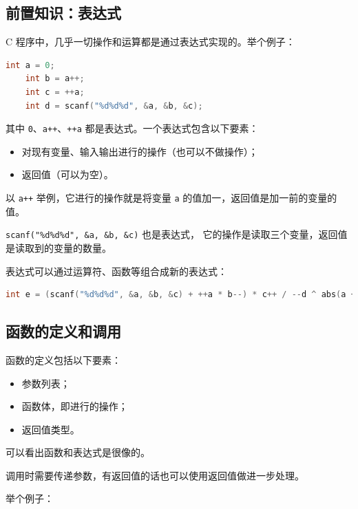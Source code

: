 \documentclass[lang=cn,newtx,10pt,scheme=chinese]{elegantbook}
\begin{document}
\subsection{前置知识：表达式}

C 程序中，几乎一切操作和运算都是通过表达式实现的。举个例子：

\begin{lstlisting}[language=C]
    int a = 0;
    int b = a++;
    int c = ++a;
    int d = scanf("%d%d%d", &a, &b, &c);
\end{lstlisting}

其中 \lstinline{0}、\lstinline{a++}、\lstinline{++a} 都是表达式。一个表达式包含以下要素：

\begin{itemize}
    \item 对现有变量、输入输出进行的操作（也可以不做操作）；
    \item 返回值（可以为空）。
\end{itemize}

以 \lstinline{a++} 举例，它进行的操作就是将变量 \lstinline{a} 的值加一，返回值是加一前的变量的值。

\lstinline{scanf("%d%d%d", &a, &b, &c)} 也是表达式，
它的操作是读取三个变量，返回值是读取到的变量的数量。

表达式可以通过运算符、函数等组合成新的表达式：

\begin{lstlisting}[language=C]
    int e = (scanf("%d%d%d", &a, &b, &c) + ++a * b--) * c++ / --d ^ abs(a + b);
\end{lstlisting}

\subsection{函数的定义和调用}

函数的定义包括以下要素：

\begin{itemize}
    \item 参数列表；
    \item 函数体，即进行的操作；
    \item 返回值类型。
\end{itemize}

可以看出函数和表达式是很像的。

调用时需要传递参数，有返回值的话也可以使用返回值做进一步处理。

举个例子：

\label{code:2.func.define_and_invoke}
\end{document}
